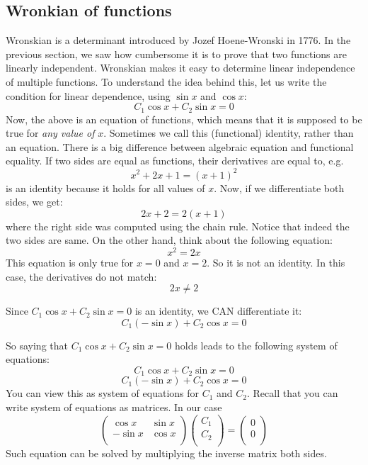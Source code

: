 \documentclass[12pt]{report}
\begin{document}
\subsection*{ Wronkian of functions }
Wronskian is a determinant introduced by Jozef Hoene-Wronski in 1776. In the previous section, we saw how cumbersome it is to prove that two functions are linearly independent. Wronskian makes it easy to determine linear independence of multiple functions.
To understand the idea behind this, let us write the condition for linear dependence, using $\sin x$ and $\cos x$:
$$C_1 \cos x + C_2 \sin x = 0$$
Now, the above is an equation of functions, which means that it is supposed to be true for \textit{any value of} $x$. Sometimes we call this (functional) identity, rather than an equation. There is a big difference between algebraic equation and functional equality. If two sides are equal as functions, their derivatives are equal to, e.g.
$$x^2 +2x+1= (x+1)^2$$
is an identity because it holds for all values of $x$. Now, if we differentiate both sides, we get:
$$2x+2 = 2(x+1)$$
where the right side was computed using the chain rule. Notice that indeed the two sides are same.
On the other hand, think about the following equation:
$$x^2 = 2x$$
This equation is only true for $x=0$ and $x=2$. So it is not an identity. In this case, the derivatives do not match:
$$2x \neq 2 $$

Since $C_1 \cos x + C_2 \sin x = 0$ is an identity, we CAN differentiate it:
$$C_1 (-\sin x) +C_2 \cos x = 0$$

So saying that $C_1 \cos x + C_2 \sin x = 0$ holds leads to the following system of equations:
$$C_1 \cos x + C_2 \sin x = 0$$
$$C_1 (-\sin x) +C_2 \cos x = 0$$
You can view this as system of equations for $C_1$ and $C_2$. Recall that you can write system of equations as matrices. In our case
$$\left( {\begin{array}{cc} \cos x & \sin x \\ -\sin x & \cos x \\ \end{array} } \right) \left( {\begin{array}{c} C_1 \\  C_2 \\ \end{array} } \right) =\left( {\begin{array}{c} 0 \\  0 \\ \end{array} } \right) $$
Such equation can be solved by multiplying the inverse matrix both sides.
\end{document}
